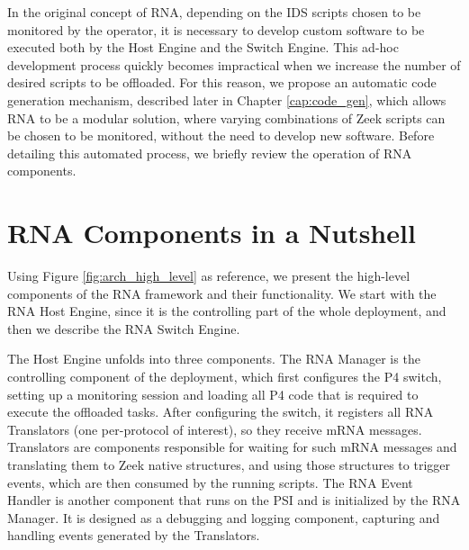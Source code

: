 In the original concept of RNA, depending on the IDS scripts chosen to be monitored by the operator, it is necessary to develop custom software to be executed both by the Host Engine and the Switch Engine. This ad-hoc development process quickly becomes impractical when we increase the number of desired scripts to be offloaded. For this reason, we propose an automatic code generation mechanism, described later in Chapter \ref{cap:code_gen}, which allows RNA to be a modular solution, where varying combinations of Zeek scripts can be chosen to be monitored, without the need to develop new software. Before detailing this automated process, we briefly review the operation of RNA components.

\section{RNA Components in a Nutshell}

Using Figure \ref{fig:arch_high_level} as reference, we present the high-level components of the RNA framework and their functionality. We start with the RNA Host Engine, since it is the controlling part of the whole deployment, and then we describe the RNA Switch Engine.

The Host Engine unfolds into three components. The RNA Manager is the controlling component of the deployment, which first configures the P4 switch, setting up a monitoring session and loading all P4 code that is required to execute the offloaded tasks. After configuring the switch, it registers all RNA Translators (one per-protocol of interest), so they receive mRNA messages. Translators are components responsible for waiting for such mRNA messages and translating them to Zeek native structures, and using those structures to trigger events, which are then consumed by the running scripts. The RNA Event Handler is another component that runs on the PSI and is initialized by the RNA Manager. It is designed as a debugging and logging component, capturing and handling events generated by the Translators.

